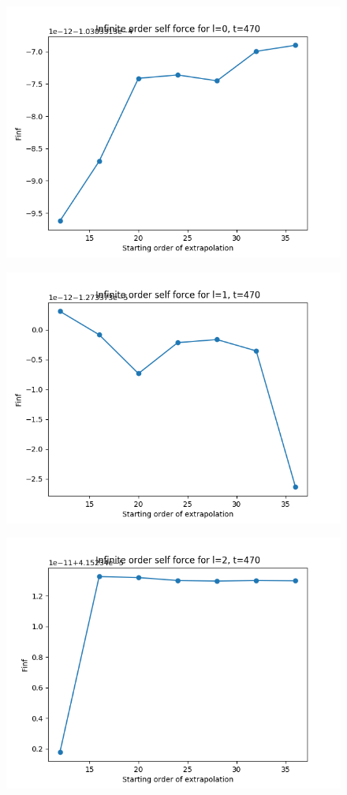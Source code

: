 \documentclass{article}
\begin{document}
\begin{figure}
  \includegraphics{bestfinfselectorplott470l0}
\end{figure}
\begin{figure}
  \includegraphics{bestfinfselectorplott470l1}
\end{figure}
\begin{figure}
  \includegraphics{bestfinfselectorplott470l2}
\end{figure}
\end{document}
